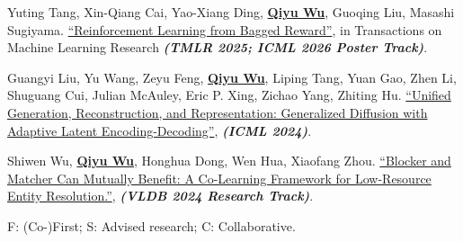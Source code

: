 \documentclass[10pt, letterpaper]{article}
\begin{document}
\begin{description}[leftmargin=3.5em,labelwidth=3em,labelsep=0.5em,topsep=0.10cm,itemsep=0.10cm,parsep=0pt]
        \item [{[C3]}] Yuting Tang, Xin-Qiang Cai, Yao-Xiang Ding, \underline{\textbf{Qiyu Wu}}, Guoqing Liu, Masashi Sugiyama. \href{https://arxiv.org/pdf/2402.03771.pdf}{``Reinforcement Learning from Bagged Reward''}, in Transactions on Machine Learning Research \textit{\textbf{(TMLR 2025; ICML 2026 Poster Track)}}.
        \item [{[C2]}] Guangyi Liu, Yu Wang, Zeyu Feng, \underline{\textbf{Qiyu Wu}}, Liping Tang, Yuan Gao, Zhen Li, Shuguang Cui, Julian McAuley, Eric P. Xing, Zichao Yang, Zhiting Hu. \href{https://arxiv.org/abs/2402.19009}{``Unified Generation, Reconstruction, and Representation: Generalized Diffusion with Adaptive Latent Encoding-Decoding''}, \textit{\textbf{(ICML 2024)}}.
        \item [{[C1]}] Shiwen Wu, \underline{\textbf{Qiyu Wu}}, Honghua Dong, Wen Hua, Xiaofang Zhou. \href{https://dl.acm.org/doi/abs/10.14778/3632093.3632096}{``Blocker and Matcher Can Mutually Benefit: A Co-Learning Framework for Low-Resource Entity Resolution.''}, \textit{\textbf{(VLDB 2024 Research Track)}}.
      \end{description}

      \noindent\footnotesize F: (Co-)First; S: Advised research; C: Collaborative.
\end{document}
